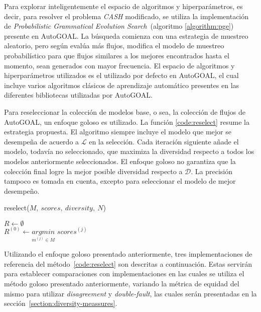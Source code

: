 Para explorar inteligentemente  el espacio de algoritmos y hiperparámetros, es decir, para resolver el problema \textit{CASH} modificado, se utiliza la implementación de \emph{Probabilistic Grammatical Evolution Search}~(algoritmo \ref{algorithm:pge}) presente en AutoGOAL.
La búsqueda comienza con una estrategia de muestreo aleatorio, pero según evalúa más flujos, modifica el modelo de muestreo probabilístico para que flujos similares a los mejores encontrados hasta el momento, sean generados con mayor frecuencia.
El espacio de algoritmos y hiperparámetros utilizados es el utilizado por defecto en AutoGOAL, el cual incluye varios algoritmos clásicos de aprendizaje automático presentes en las diferentes bibliotecas utilizadas por AutoGOAL.

Para reseleccionar la colección de modelos base, o sea, la colección de flujos de AutoGOAL, un enfoque goloso es utilizado.
La función \ref{code:reselect} resume la estrategia propuesta.
El algoritmo siempre incluye el modelo que mejor se desempeña de acuerdo a $\mathcal{L}$ en la selección. Cada iteración siguiente añade el modelo, todavía no seleccionado, que maximiza la diversidad respecto a todos los modelos anteriormente seleccionados.
El enfoque goloso no garantiza que la colección final logre la mejor posible diversidad respecto a $\mathcal{D}$.
La precisión tampoco es tomada en cuenta, excepto para seleccionar el modelo de mejor desempeño.

\begin{function}[htb!]
    \caption{reselect($M,\ scores,\ diversity,\ N$)\label{code:reselect}}

    \init $R \leftarrow \emptyset$ \\
    \init $R^{(0)} \leftarrow \underset{m^{(j)} \in M}{argmin}$ $scores^{(j)}$ \\

\end{function}

Utilizando el enfoque goloso presentado anteriormente, tres implementaciones de referencia del método~\ref{code:reselect} son descritas a continuación.
Estas servirán para establecer comparaciones con implementaciones en las cuales se utiliza el método goloso presentado anteriormente, variando la métrica de equidad del mismo para utilizar \textit{disagreement} y \textit{double-fault}, las cuales serán presentadas en la sección~\ref{section:diversity-meassures}.

